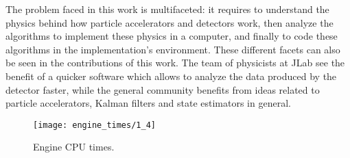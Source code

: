  \label{sec:concluding_remarks}
The problem faced in this work is multifaceted: it requires to understand the physics behind how particle accelerators and detectors work, then analyze the algorithms to implement these physics in a computer, and finally to code these algorithms in the implementation's environment.
These different facets can also be seen in the contributions of this work.
The team of physicists at JLab see the benefit of a quicker software which allows to analyze the data produced by the detector faster, while the general community benefits from ideas related to particle accelerators, Kalman filters and state estimators in general.

    \begin{figure}[ht]
        \centering
        \texttt{[image: engine\_times/1\_4]}
        \caption{\label{fig:engines_times-final} Engine CPU times.}
    \end{figure}

